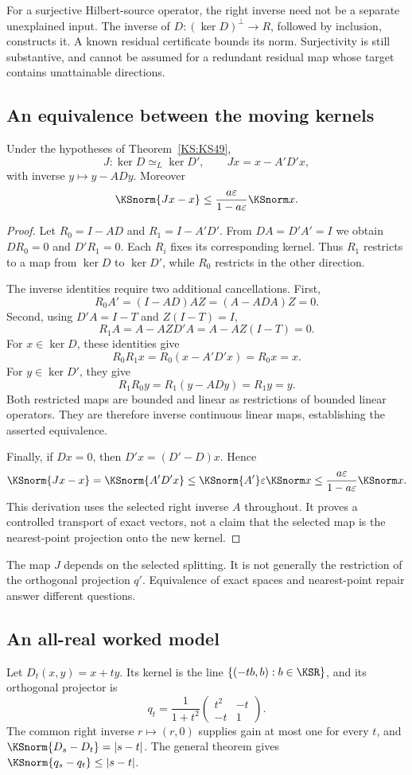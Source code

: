 For a surjective Hilbert-source operator, the right inverse need not be a separate unexplained input. The inverse of \(D:(\ker D)^\perp\to R\), followed by inclusion, constructs it. A known residual certificate bounds its norm. Surjectivity is still substantive, and cannot be assumed for a redundant residual map whose target contains unattainable directions.

\subsection{An equivalence between the moving kernels}
\begin{KStheorem}\label{KS:KS50}
Under the hypotheses of Theorem~\ref{KS:KS49},
\[
 J:\ker D\simeq_L\ker D',\qquad Jx=x-A'D'x,
\]
with inverse \(y\mapsto y-ADy\). Moreover
\[
 \KSnorm{Jx-x}\le\frac{a\varepsilon}{1-a\varepsilon}\KSnorm x.
\]
\end{KStheorem}
\begin{proof}
Let $R_0=I-AD$ and $R_1=I-A'D'$. From $DA=D'A'=I$ we obtain $DR_0=0$ and $D'R_1=0$. Each $R_i$ fixes its corresponding kernel. Thus $R_1$ restricts to a map from $\ker D$ to $\ker D'$, while $R_0$ restricts in the other direction.

The inverse identities require two additional cancellations. First,
\[
 R_0A'=(I-AD)AZ=(A-ADA)Z=0.
\]
Second, using $D'A=I-T$ and $Z(I-T)=I$,
\[
 R_1A=A-AZD'A=A-AZ(I-T)=0.
\]
For $x\in\ker D$, these identities give
\[
 R_0R_1x=R_0(x-A'D'x)=R_0x=x.
\]
For $y\in\ker D'$, they give
\[
 R_1R_0y=R_1(y-ADy)=R_1y=y.
\]
Both restricted maps are bounded and linear as restrictions of bounded linear operators. They are therefore inverse continuous linear maps, establishing the asserted equivalence.

Finally, if $Dx=0$, then $D'x=(D'-D)x$. Hence
\[
 \KSnorm{Jx-x}=\KSnorm{A'D'x}
 \le\KSnorm{A'}\varepsilon\KSnorm x
 \le\frac{a\varepsilon}{1-a\varepsilon}\KSnorm x.
\]
This derivation uses the selected right inverse $A$ throughout. It proves a controlled transport of exact vectors, not a claim that the selected map is the nearest-point projection onto the new kernel.
\end{proof}
The map \(J\) depends on the selected splitting. It is not generally the restriction of the orthogonal projection \(q'\). Equivalence of exact spaces and nearest-point repair answer different questions.

\subsection{An all-real worked model}
Let \(D_t(x,y)=x+ty\). Its kernel is the line \(\{(-tb,b):b\in\KSR\}\), and its orthogonal projector is
\begin{equation}\label{KS:eq:lineprojector}
 q_t=\frac1{1+t^2}
 \begin{pmatrix}t^2&-t\\-t&1\end{pmatrix}.
\end{equation}
The common right inverse \(r\mapsto(r,0)\) supplies gain at most one for every \(t\), and \(\KSnorm{D_s-D_t}=|s-t|\). The general theorem gives \(\KSnorm{q_s-q_t}\le|s-t|\).

